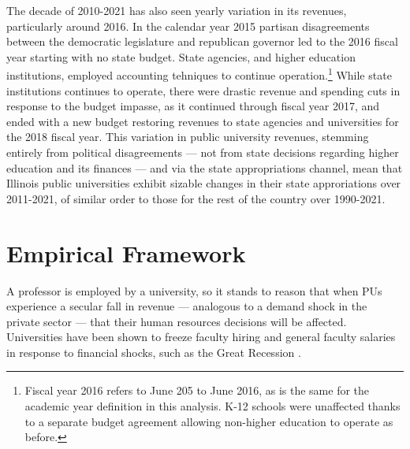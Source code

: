 \documentclass[notitlepage,12pt]{article}
\begin{document}
The decade of 2010-2021 has also seen yearly variation in its revenues, particularly around 2016.
In the calendar year 2015 partisan disagreements between the democratic legislature and republican governor led to the 2016 fiscal year starting with no state budget.
State agencies, and higher education institutions, employed accounting tehniques to continue operation.\footnote{
    Fiscal year 2016 refers to June 205 to June 2016, as is the same for the academic year definition in this analysis. 
    K-12 schools were unaffected thanks to a separate budget agreement allowing non-higher education to operate as before.
}
While state institutions continues to operate, there were drastic revenue and spending cuts in response to the budget impasse, as it continued through fiscal year 2017, and ended with a new budget restoring revenues to state agencies and universities for the 2018 fiscal year.
This variation in public university revenues, stemming entirely from political disagreements --- not from state decisions regarding higher education and its finances \citep{young2020squandered} --- and via the state appropriations channel, mean that Illinois public universities exhibit sizable changes in their state approriations over 2011-2021, of similar order to those for the rest of the country over 1990-2021.


\section{Empirical Framework}
\label{sec:empirics}

A professor is employed by a university, so it stands to reason that when PUs experience a secular fall in revenue --- analogous to a demand shock in the private sector --- that their human resources decisions will be affected.
Universities have been shown to freeze faculty hiring and general faculty salaries in response to financial shocks, such as the Great Recession \citep{turner2014impact}.
\end{document}
